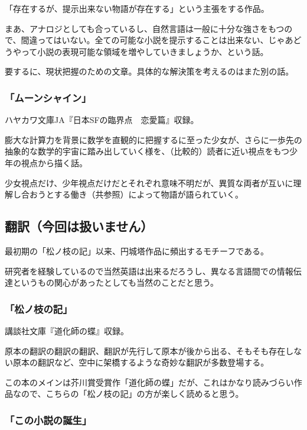 \documentclass[10pt, a5paper, twoside]{jsarticle}
\theoremstyle{definition}
\begin{document}
				「存在するが、提示出来ない物語が存在する」という主張をする作品。

				まあ、アナロジとしても合っているし、自然言語は一般に十分な強さをもつので、間違ってはいない。全ての可能な小説を提示することは出来ない、じゃあどうやって小説の表現可能な領域を増やしていきましょうか、という話。

				要するに、現状把握のための文章。具体的な解決策を考えるのはまた別の話。

			\subsubsection{「ムーンシャイン」}

				ハヤカワ文庫JA『日本SFの臨界点　恋愛篇』収録。

				膨大な計算力を背景に数学を直観的に把握するに至った少女が、さらに一歩先の抽象的な数学的宇宙に踏み出していく様を、（比較的）読者に近い視点をもつ少年の視点から描く話。

				少女視点だけ、少年視点だけだとそれぞれ意味不明だが、異質な両者が互いに理解し合おうとする働き（共参照）によって物語が語られていく。

		\subsection{翻訳（今回は扱いません）}

			最初期の「松ノ枝の記」以来、円城塔作品に頻出するモチーフである。

			研究者を経験しているので当然英語は出来るだろうし、異なる言語間での情報伝達というもの関心があったとしても当然のことだと思う。

			\subsubsection{「松ノ枝の記」}

				講談社文庫『道化師の蝶』収録。

				原本の翻訳の翻訳の翻訳、翻訳が先行して原本が後から出る、そもそも存在しない原本の翻訳など、空中に架橋するような奇妙な翻訳が多数登場する。

				この本のメインは芥川賞受賞作「道化師の蝶」だが、これはかなり読みづらい作品なので、こちらの「松ノ枝の記」の方が楽しく読めると思う。

			\subsubsection{「この小説の誕生」}
				
\end{document}
